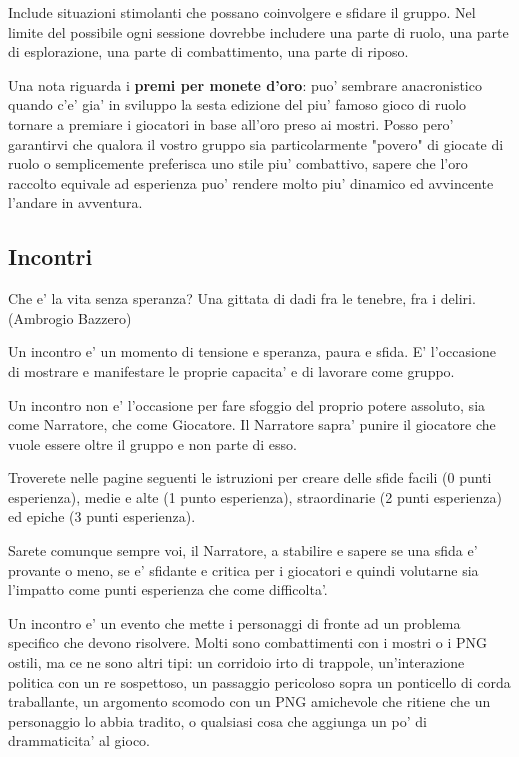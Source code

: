 \documentclass[a4paper,11pt,twoside,openany]{dndbook}
\begin{document}
{Include situazioni stimolanti che possano coinvolgere e sfidare il gruppo.
Nel limite del possibile ogni sessione dovrebbe includere una parte di ruolo, una parte di esplorazione, una parte di combattimento, una parte di riposo.

\bigskip

Una nota riguarda i \textbf{premi per monete d'oro}: puo' sembrare anacronistico quando c'e' gia' in sviluppo la sesta edizione del piu' famoso gioco di ruolo tornare a premiare i giocatori in base all'oro preso ai mostri. Posso pero' garantirvi che qualora il vostro gruppo sia particolarmente "povero" di giocate di ruolo o semplicemente preferisca uno stile piu' combattivo, sapere che l'oro raccolto equivale ad esperienza puo' rendere molto piu' dinamico ed avvincente l'andare in avventura.

\subsection{Incontri}


\begin{quotebox}
{Che e' la vita senza speranza? Una gittata di dadi fra le tenebre, fra i deliri. (Ambrogio Bazzero)}
\end{quotebox}

\label{incontri}

Un incontro e' un momento di tensione e speranza, paura e sfida. E' l'occasione di mostrare e manifestare le proprie capacita' e di lavorare come gruppo.

Un incontro non e' l'occasione per fare sfoggio del proprio potere assoluto, sia come Narratore, che come Giocatore. Il Narratore sapra' punire il giocatore che vuole essere oltre il gruppo e non parte di esso.

Troverete nelle pagine seguenti le istruzioni per creare delle sfide facili (0 punti esperienza), medie e alte (1 punto esperienza), straordinarie (2 punti esperienza) ed epiche (3 punti esperienza).

Sarete comunque sempre voi, il Narratore, a stabilire e sapere se una sfida e' provante o meno, se e' sfidante e critica per i giocatori e quindi volutarne sia l'impatto come punti esperienza che come difficolta'.

Un incontro e' un evento che mette i personaggi di fronte ad un problema specifico che devono risolvere. Molti sono combattimenti con i mostri o i PNG ostili, ma ce ne sono altri tipi: un corridoio irto di trappole, un'interazione politica con un re sospettoso, un passaggio pericoloso sopra un ponticello di corda traballante, un argomento scomodo con un PNG amichevole che ritiene che un personaggio lo abbia tradito, o qualsiasi cosa che aggiunga un po' di drammaticita' al gioco.

}
\end{document}
